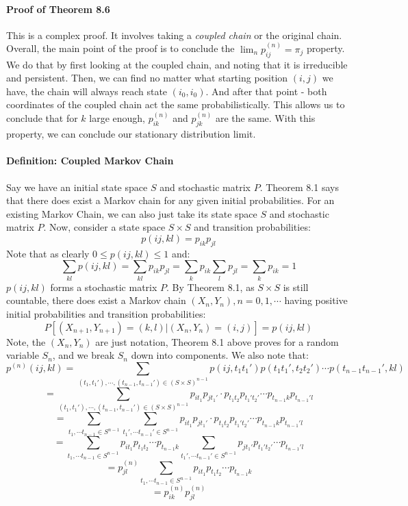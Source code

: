 \documentclass[12pt,a4paper]{article}
\newcommand{\1}[1]{\mathbbm{1}\left\{ #1 \right\}}
\begin{document}
\paragraph{Proof of Theorem 8.6} This is a complex proof. It involves taking a \textit{coupled chain} or the original chain. Overall, the main point of the proof is to conclude the $\lim_n p_{ij}^{(n)} = \pi_j$ property. We do that by first looking at the coupled chain, and noting that it is irreducible and persistent. Then, we can find no matter what starting position $(i,j)$ we have, the chain will always reach state $(i_0,i_0)$. And after that point - both coordinates of the coupled chain act the same probabilistically. This allows us to conclude that for $k$ large enough, $p_{ik}^{(n)}$ and $p_{jk}^{(n)}$ are the same. With this property, we can conclude our stationary distribution limit.

\paragraph{Definition: Coupled Markov Chain} Say we have an initial state space $S$ and stochastic matrix $P$. Theorem 8.1 says that there does exist a Markov chain for any given initial probabilities. For an existing Markov Chain, we can also just take its state space $S$ and stochastic matrix $P$. Now, consider a state space $S \times S$ and transition probabilities:
$$
	p(ij, kl) = p_{ik}p_{jl}
$$
Note that as clearly $0 \leq p(ij, kl) \leq 1$ and:
$$
	\sum_{kl} p(ij, kl) = \sum_{kl} p_{ik}p_{jl} = \sum_k p_{ik} \sum_l p_{jl} = \sum_k p_{ik} = 1
$$
$p(ij, kl)$ forms a stochastic matrix $P$. By Theorem 8.1, as $S \times S$ is still countable, there does exist a Markov chain $(X_n, Y_n), n = 0, 1, \cdots$ having positive initial probabilities and transition probabilities:
$$
	P\left[(X_{n+1}, Y_{n+1}) = (k,l) | (X_n, Y_n) = (i, j)\right] = p(ij, kl)
$$
Note, the $(X_n, Y_n)$ are just notation, Theorem 8.1 above proves for a random variable $S_n$, and we break $S_n$ down into components. We also note that:
$$
	p^{(n)}(ij, kl) = \sum_{(t_1, t_1'), \cdots, (t_{n-1}, t_{n-1}') \in (S \times S)^{n-1}} 
	p(ij, t_1t_1') p(t_1t_1', t_2t_2') \cdots p(t_{n-1}t_{n-1}', kl)
$$
$$
	= \sum_{(t_1, t_1'), \cdots, (t_{n-1}, t_{n-1}') \in (S \times S)^{n-1}}
	p_{it_1}p_{jt_1'} \cdot p_{t_1t_2}p_{t_1't_2'} \cdots p_{t_{n-1}k}p_{t_{n-1}'l}
$$
$$
	= \sum_{t_1, \cdots t_{n-1} \in S^{n-1}} \sum_{t_1', \cdots t_{n-1}' \in S^{n-1}}
	p_{it_1}p_{jt_1'} \cdot p_{t_1t_2}p_{t_1't_2'} \cdots p_{t_{n-1}k}p_{t_{n-1}'l}
$$
$$
	= \sum_{t_1, \cdots t_{n-1} \in S^{n-1}} p_{it_1}p_{t_1t_2} \cdots p_{t_{n-1}k}
	\sum_{t_1', \cdots t_{n-1}' \in S^{n-1}}
	p_{jt_1'}p_{t_1't_2'} \cdots p_{t_{n-1}'l}
$$
$$
	= p_{jl}^{(n)} \sum_{t_1, \cdots t_{n-1} \in S^{n-1}} p_{it_1}p_{t_1t_2} \cdots p_{t_{n-1}k}
$$
$$
	= p_{ik}^{(n)}p_{jl}^{(n)}
$$
\end{document}
